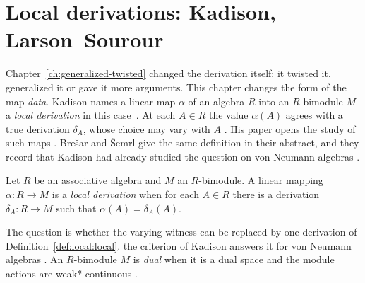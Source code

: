 \section{Local derivations: Kadison, Larson--Sourour}\label{sec:local-characterizations:local}

Chapter~\ref{ch:generalized-twisted} changed the derivation itself: it
twisted it, generalized it or gave it more arguments.
This chapter changes the form of the map
\emph{data}. Kadison names a linear map $\alpha$ of an algebra $R$ into an
$R$-bimodule $M$ a \emph{local derivation} in this case~\cite[p.~494]{Kadison1990Local}. At each $A\in R$
the value $\alpha(A)$ agrees with a true derivation $\delta_A$, whose choice
may vary with $A$ \cite[p.~494]{Kadison1990Local}. His paper opens the
study of such maps \cite[p.~494]{Kadison1990Local}.
Bre\v{s}ar and \v{S}emrl give the same definition in their abstract, and they
record that Kadison had already studied the question on von Neumann algebras
\cite[p.~483]{BresarSemrl1993}.

\begin{definition}\label{def:local:local}
Let $R$ be an associative algebra and $M$ an $R$-bimodule. A linear mapping
$\alpha\colon R\to M$ is a \emph{local derivation} when for each $A\in R$
there is a derivation $\delta_{A}\colon R\to M$ such that
$\alpha(A)=\delta_{A}(A)$.
\end{definition}

The question is whether the varying witness can be replaced by one
derivation of Definition~\ref{def:local:local}. the criterion of Kadison answers
it for von Neumann algebras \cite[p.~494]{Kadison1990Local}. An $R$-bimodule $M$ is \emph{dual} when it
is a dual space and the module actions are weak* continuous
\cite[p.~494]{Kadison1990Local}.

